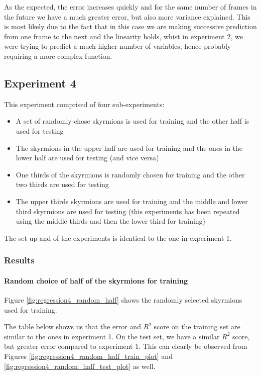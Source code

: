 \documentclass[a4paper]{article}
\begin{document}
  As the expected, the error increases quickly and for the same number of frames in the future we have a much greater error, but also more variance explained. This is most likely due to the fact that in this case we are making successive prediction from one frame to the next and the linearity holds, whist in experiment 2, we were trying to predict a much higher number of variables, hence probably requiring a more complex function.

  \subsection{Experiment 4}
  This experiment comprised of four sub-experiments:

  \begin{itemize}
    \item A set of randomly chose skyrmions is used for training and the other half is used for testing
    \item The skyrmions in the upper half are used for training and the ones in the lower half are used for testing (and vice versa)
    \item One thirds of the skyrmions is randomly chosen for training and the other two thirds are used for testing
    \item The upper thirds skyrmions are used for training and the middle and lower third skyrmions are used for testing (this experiments has been repeated using the middle thirds and then the lower third for training)
  \end{itemize}

  The set up and of the experiments is identical to the one in experiment 1.

  \subsubsection{Results}

  \paragraph{Random choice of half of the skyrmions for training}
  
  Figure \ref{fig:regression4_random_half} shows the randomly selected skyrmions used for training.

  The table below shows us that the error and $R^2$ score on the training set are similar to the ones in experiment 1. On the test set, we have a similar $R^2$ score, but greater error compared to experiment 1. This can clearly be observed from Figures \ref{fig:regression4_random_half_train_plot} and \ref{fig:regression4_random_half_test_plot} as well.
\end{document}
